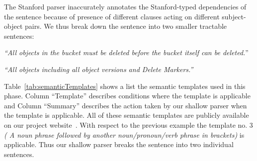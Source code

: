 The Stanford parser inaccurately annotates the Stanford-typed dependencies of the sentence because of presence of different clauses acting on different subject-object pairs.
We thus break down the sentence into two smaller tractable sentences:

\begin{center}
\scriptsize \textit{``All objects in the bucket must be deleted before the bucket itself can be deleted.}''
	
\textit{``All objects including all object versions and Delete Markers.''}\normalsize 
\end{center} 


Table~\ref{tab:semanticTemplates} shows a list the semantic templates used in this phase.
Column ``Template'' describes conditions where the template is applicable and Column ``Summary'' describes the action taken by our shallow parser when the template is applicable.
All of these semantic templates are publicly available on our project website~\cite{projectweb}.
With respect to the previous example the template no. 3 \textit{( A noun phrase followed by another noun/pronoun/verb phrase in brackets)} is applicable.
Thus our shallow parser breaks the sentence into two individual sentences.
	 
